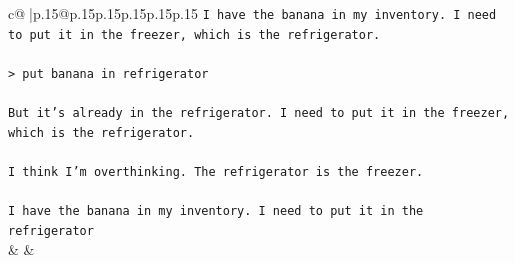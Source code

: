 \documentclass{article}
\begin{document}
{\begin{supertabular}{c@{$\;$}|p{.15\linewidth}@{}p{.15\linewidth}p{.15\linewidth}p{.15\linewidth}p{.15\linewidth}p{.15\linewidth}}
{{{\texttt{I have the banana in my inventory. I need to put it in the freezer, which is the refrigerator.} \\
\\ 
\texttt{> put banana in refrigerator} \\
\\ 
\texttt{But it's already in the refrigerator. I need to put it in the freezer, which is the refrigerator.} \\
\\ 
\texttt{I think I'm overthinking. The refrigerator is the freezer.} \\
\\ 
\texttt{I have the banana in my inventory. I need to put it in the refrigerator} \\
            }
        }
    }
    & & \\ \\


\end{supertabular}}
\end{document}
